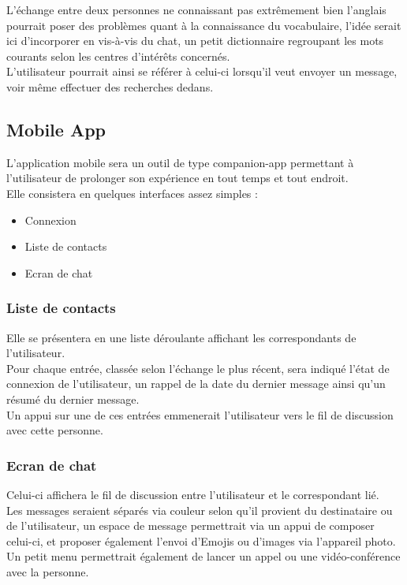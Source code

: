 \documentclass{report}
\begin{document}
			L'échange entre deux personnes ne connaissant pas extrêmement bien l'anglais pourrait poser des problèmes quant à la connaissance du vocabulaire, l'idée serait ici d'incorporer en vis-à-vis du chat, un petit dictionnaire regroupant les mots courants selon les centres d'intérêts concernés.\\
			L'utilisateur pourrait ainsi se référer à celui-ci lorsqu'il veut envoyer un message, voir même effectuer des recherches dedans.\\

	\subsection{Mobile App}

		L'application mobile sera un outil de type companion-app permettant à l'utilisateur de prolonger son expérience en tout temps et tout endroit.\\

		Elle consistera en quelques interfaces assez simples : \\

		\begin{itemize}
			\item Connexion
			\item Liste de contacts
			\item Ecran de chat
		\end{itemize}

		\subsubsection{Liste de contacts}

			Elle se présentera en une liste déroulante affichant les correspondants de l'utilisateur.\\
			Pour chaque entrée, classée selon l'échange le plus récent, sera indiqué l'état de connexion de l'utilisateur, un rappel de la date du dernier message ainsi qu'un résumé du dernier message.\\

			Un appui sur une de ces entrées emmenerait l'utilisateur vers le fil de discussion avec cette personne.\\

		\subsubsection{Ecran de chat}

			Celui-ci affichera le fil de discussion entre l'utilisateur et le correspondant lié.\\
			Les messages seraient séparés via couleur selon qu'il provient du destinataire ou de l'utilisateur, un espace de message permettrait via un appui de composer celui-ci, et proposer également l'envoi d'Emojis ou d'images via l'appareil photo.\\
			Un petit menu permettrait également de lancer un appel ou une vidéo-conférence avec la personne.\\
\end{document}
